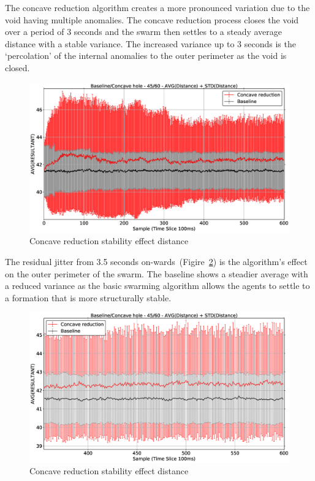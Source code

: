 The concave reduction algorithm creates a more pronounced variation due to the void having multiple anomalies. The concave reduction process closes the void over a period of 3 seconds and the swarm then settles to a steady average distance with a stable variance. The increased variance up to 3 seconds is the `percolation' of the internal anomalies to the outer perimeter as the void is closed.
\begin{figure}[H]
\begin{center}
\includegraphics[width=15cm]{CHAPTER-7/figures/ConcavePerimeter4560-DIST}
\end{center}
\caption{Concave reduction stability effect distance\label{voids:ConcavePerimeter4560-DIST}}
\end{figure}

The residual jitter from 3.5 seconds on-wards~(Figire~\ref{voids:ConcavePerimeter4560-DIST-2}) is the algorithm's effect on the outer perimeter of the swarm. The baseline shows a steadier average with a reduced variance as the basic swarming algorithm allows the agents to settle to a formation that is more structurally stable.
\begin{figure}[H]
\begin{center}
\includegraphics[width=15cm]{CHAPTER-7/figures/ConcavePerimeter4560-DIST-2}
\end{center}
\caption{Concave reduction stability effect distance\label{voids:ConcavePerimeter4560-DIST-2}}
\end{figure}


